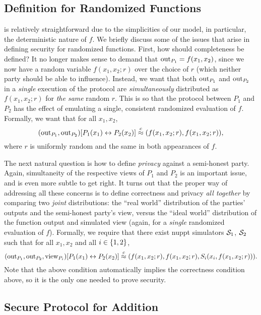 \documentclass[11pt]{article}
\begin{document}
\subsection{Definition for Randomized Functions}
\label{sec:defin-rand-funct}

 is relatively straightforward due to
the simplicities of our model, in particular, the deterministic nature
of $f$.  We briefly discuss some of the issues that arise in defining
security for randomized functions.  First, how should completeness be
defined?  It no longer makes sense to demand that $\text{out}_{P_{1}} =
f(x_{1}, x_{2})$, since we now have a random variable $f(x_{1}, x_{2};
r)$ over the choice of $r$ (which neither party should be able to
influence).  Instead, we want that both $\text{out}_{P_{1}}$ and
$\text{out}_{P_{2}}$ in a \emph{single} execution of the protocol are
\emph{simultaneously} distributed as $f(x_{1}, x_{2}; r)$ for
\emph{the same} random $r$.  This is so that the protocol between
$P_{1}$ and $P_{2}$ has the effect of emulating a single, consistent
randomized evaluation of $f$.  Formally, we want that for all $x_{1},
x_{2}$, \[ (\text{out}_{P_{1}}, \text{out}_{P_{2}})[P_{1}(x_{1}) \leftrightarrow
P_{2}(x_{2})] \stackrel{c}{\approx} (f(x_{1}, x_{2}; r), f(x_{1}, x_{2}; r)), \]
where $r$ is uniformly random and the same in both appearances of $f$.

The next natural question is how to define \emph{privacy} against a
semi-honest party.  Again, simultaneity of the respective views of
$P_{1}$ and $P_{2}$ is an important issue, and is even more subtle to
get right.  It turns out that the proper way of addressing all these
concerns is to define correctness and privacy \emph{all together} by
comparing two \emph{joint} distributions: the ``real world''
distribution of the parties' outputs and the semi-honest party's view,
versus the ``ideal world'' distribution of the function output and
simulated view (again, for a \emph{single} randomized evaluation of
$f$).  Formally, we require that there exist nuppt simulators
$\mathcal{S}_{1}$, $\mathcal{S}_{2}$ such that for all $x_{1}, x_{2}$ and all $i \in
\{1,2\}$, \[ (\text{out}_{P_{1}}, \text{out}_{P_{2}},\text{view}_{P_i})[P_1(x_1)
\leftrightarrow P_2(x_2)] \stackrel{c}{\approx} (f(x_{1}, x_{2}; r),
f(x_1,x_2;r),S_i(x_i,f(x_1,x_2;r))). \] Note that the above condition
automatically implies the correctness condition above, so it is the
only one needed to prove security.

\subsection{Secure Protocol for Addition}
\label{sec:secure-prot-addit}
\end{document}
